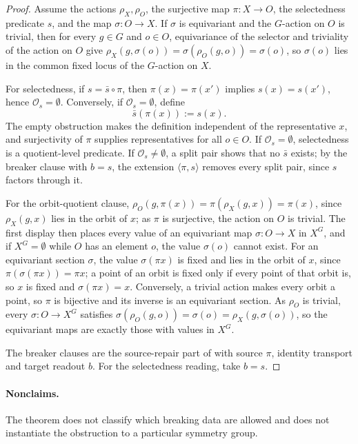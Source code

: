 \begin{proof}
Assume the actions \(\rho_X,\rho_O\), the surjective map
\(\pi:X\to O\), the selectedness predicate \(s\), and the map
\(\sigma:O\to X\).  If \(\sigma\) is equivariant and the \(G\)-action on
\(O\) is trivial, then for every \(g\in G\) and \(o\in O\), equivariance of
the selector and triviality of the action on \(O\) give
\(\rho_X(g,\sigma(o))=\sigma(\rho_O(g,o))=\sigma(o)\), so
\(\sigma(o)\) lies in the common fixed locus of the \(G\)-action on
\(X\).

For selectedness, if \(s=\bar s\circ\pi\), then
\(\pi(x)=\pi(x')\) implies \(s(x)=s(x')\), hence
\(\mathcal O_s=\emptyset\).  Conversely, if
\(\mathcal O_s=\emptyset\), define
\[
  \bar s(\pi(x)):=s(x).
\]
The empty obstruction makes the definition independent of the
representative \(x\), and surjectivity of \(\pi\) supplies
representatives for all \(o\in O\).  If \(\mathcal O_s=\emptyset\), selectedness is a quotient-level
predicate. If \(\mathcal O_s\ne\emptyset\), a split pair shows that no
\(\bar s\) exists; by the breaker clause with \(b=s\), the extension
\(\langle\pi,s\rangle\) removes every split pair, since \(s\) factors through
it.

For the orbit-quotient clause, \(\rho_O(g,\pi(x))=\pi(\rho_X(g,x))=\pi(x)\),
since \(\rho_X(g,x)\) lies in the orbit of \(x\); as \(\pi\) is surjective, the
action on \(O\) is trivial. The first display then places every value of an
equivariant map \(\sigma:O\to X\) in \(X^G\), and if \(X^G=\emptyset\) while \(O\) has an
element \(o\), the value \(\sigma(o)\) cannot exist. For an equivariant section \(\sigma\), the value \(\sigma(\pi x)\) is fixed and lies in the orbit of \(x\), since \(\pi(\sigma(\pi x))=\pi x\); a point of an orbit is fixed only if every point of that orbit is, so \(x\) is fixed and \(\sigma(\pi x)=x\). Conversely, a trivial action makes every orbit a point, so \(\pi\) is bijective and its inverse is an equivariant section. As \(\rho_O\) is trivial, every \(\sigma:O\to X^G\) satisfies \(\sigma(\rho_O(g,o))=\sigma(o)=\rho_X(g,\sigma(o))\), so the equivariant maps are exactly those with values in \(X^G\).

The breaker clauses are the source-repair part of  with source \(\pi\),
identity transport and target readout \(b\). For the selectedness reading, take
\(b=s\).
\end{proof}

\paragraph{Nonclaims.} The theorem does not classify which
breaking data are allowed and does not instantiate the obstruction to
a particular symmetry group.

